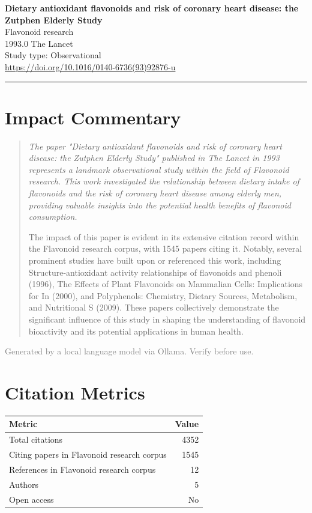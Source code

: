 \documentclass[a4paper,11pt]{article}
\begin{document}
\begin{center}
  {\LARGE\bfseries Dietary antioxidant flavonoids and risk of coronary heart disease: the Zutphen Elderly Study}\\[0.4em]
  {\large\color{accent} Flavonoid research}\\[0.25em]
  {\normalsize 1993.0 \quad The Lancet}\\[0.15em]
  {\small Study type: Observational}\\[0.1em]
  {\small\url{https://doi.org/10.1016/0140-6736(93)92876-u}}
\end{center}
\vspace{0.4em}\noindent\rule{\linewidth}{0.5pt}\vspace{0.4em}


\section*{Impact Commentary}
\begin{quote}\itshape
The paper "Dietary antioxidant flavonoids and risk of coronary heart disease: the Zutphen Elderly Study" published in The Lancet in 1993 represents a landmark observational study within the field of Flavonoid research. This work investigated the relationship between dietary intake of flavonoids and the risk of coronary heart disease among elderly men, providing valuable insights into the potential health benefits of flavonoid consumption.

The impact of this paper is evident in its extensive citation record within the Flavonoid research corpus, with 1545 papers citing it. Notably, several prominent studies have built upon or referenced this work, including Structure-antioxidant activity relationships of flavonoids and phenoli (1996), The Effects of Plant Flavonoids on Mammalian Cells: Implications for In (2000), and Polyphenols: Chemistry, Dietary Sources, Metabolism, and Nutritional S (2009). These papers collectively demonstrate the significant influence of this study in shaping the understanding of flavonoid bioactivity and its potential applications in human health.
\end{quote}
{\small\textcolor{gray}{Generated by a local language model via Ollama. Verify before use.}}
\bigskip

\section*{Citation Metrics}

\begin{tabular}{lr}
\toprule
Metric & Value \\
\midrule
    Total citations & 4352 \\
    Citing papers in Flavonoid research corpus & 1545 \\
    References in Flavonoid research corpus & 12 \\
    Authors & 5 \\
    Open access & No \\
\bottomrule
\end{tabular}
\end{document}
